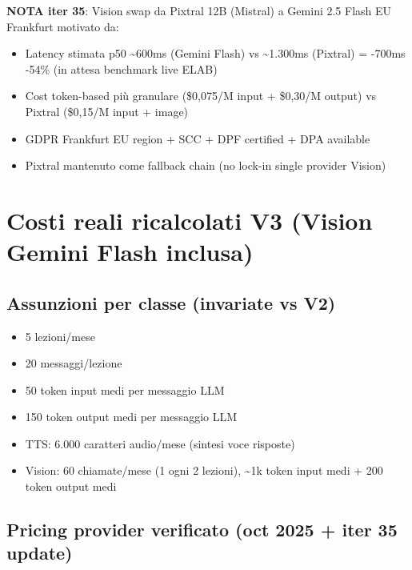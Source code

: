 \documentclass[12pt,a4paper]{article}
\begin{document}
\textbf{NOTA iter 35}: Vision swap da Pixtral 12B (Mistral) a Gemini 2.5 Flash EU Frankfurt motivato da:
\begin{itemize}[leftmargin=*]
  \item Latency stimata p50 \textasciitilde 600ms (Gemini Flash) vs \textasciitilde 1.300ms (Pixtral) = -700ms -54\% (in attesa benchmark live ELAB)
  \item Cost token-based più granulare (\$0,075/M input + \$0,30/M output) vs Pixtral (\$0,15/M input + image)
  \item GDPR Frankfurt EU region + SCC + DPF certified + DPA available
  \item Pixtral mantenuto come fallback chain (no lock-in single provider Vision)
\end{itemize}

\section{Costi reali ricalcolati V3 (Vision Gemini Flash inclusa)}

\subsection*{Assunzioni per classe (invariate vs V2)}

\begin{itemize}[leftmargin=*]
  \item 5 lezioni/mese
  \item 20 messaggi/lezione
  \item 50 token input medi per messaggio LLM
  \item 150 token output medi per messaggio LLM
  \item TTS: 6.000 caratteri audio/mese (sintesi voce risposte)
  \item Vision: 60 chiamate/mese (1 ogni 2 lezioni), \textasciitilde 1k token input medi + 200 token output medi
\end{itemize}

\subsection*{Pricing provider verificato (oct 2025 + iter 35 update)}
\end{document}
